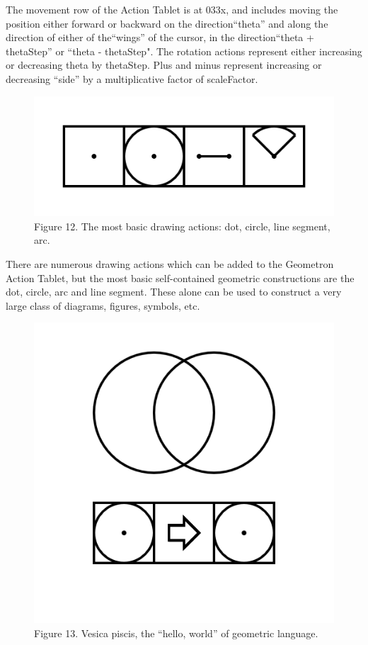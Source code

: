 \documentclass[11pt]{article}
\begin{document}
    The movement row of the Action Tablet is at 033x, and includes moving the position either forward or backward on the direction``theta'' and along the direction of either of the``wings'' of the cursor, in the direction``theta + thetaStep'' or ``theta - thetaStep".  The rotation actions represent either increasing or decreasing theta by thetaStep.  Plus and minus represent increasing or decreasing ``side'' by a multiplicative factor of scaleFactor.  


\begin{figure}

\includegraphics[width=\linewidth]{figures/figure12_basicDraw.png}

\caption{Figure 12. The most basic drawing actions: dot, circle, line segment, arc.}
\end{figure}

    There are numerous drawing actions which can be added to the Geometron Action Tablet, but the most basic self-contained geometric constructions are the dot, circle, arc and line segment.  These alone can be used to construct a very large class of diagrams, figures, symbols, etc.  

\begin{figure}

\includegraphics[width=\linewidth]{figures/figure13_vesicaPisces.png}

\caption{Figure 13. Vesica piscis, the ``hello, world'' of geometric language.}
\end{figure}
\end{document}
